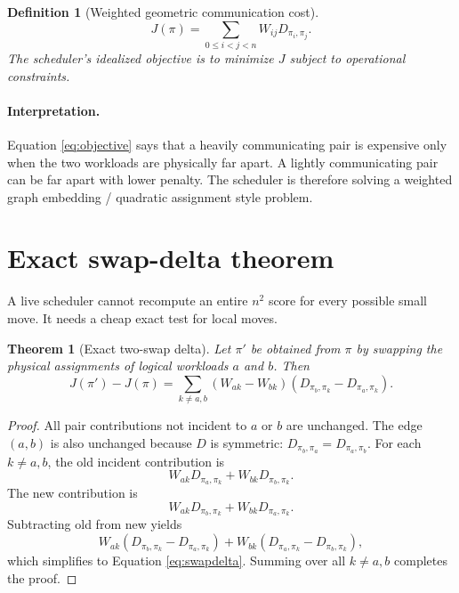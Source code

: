 \documentclass[11pt]{article}
\newtheorem{definition}{Definition}[section]
\newtheorem{theorem}{Theorem}[section]
\theoremstyle{remark}
\begin{document}
\begin{definition}[Weighted geometric communication cost]
\begin{equation}
J(\pi)=\sum_{0\le i<j<n} W_{ij}D_{\pi_i,\pi_j}.
\label{eq:objective}
\end{equation}
The scheduler's idealized objective is to minimize $J$ subject to operational constraints.
\end{definition}

\paragraph{Interpretation.} Equation \eqref{eq:objective} says that a heavily communicating pair is expensive only when the two workloads are physically far apart. A lightly communicating pair can be far apart with lower penalty. The scheduler is therefore solving a weighted graph embedding / quadratic assignment style problem.

\section{Exact swap-delta theorem}

A live scheduler cannot recompute an entire $n^2$ score for every possible small move. It needs a cheap exact test for local moves.

\begin{theorem}[Exact two-swap delta]
Let $\pi'$ be obtained from $\pi$ by swapping the physical assignments of logical workloads $a$ and $b$. Then
\begin{equation}
J(\pi')-J(\pi)=\sum_{k\ne a,b}(W_{ak}-W_{bk})\left(D_{\pi_b,\pi_k}-D_{\pi_a,\pi_k}\right).
\label{eq:swapdelta}
\end{equation}
\end{theorem}

\begin{proof}
All pair contributions not incident to $a$ or $b$ are unchanged. The edge $(a,b)$ is also unchanged because $D$ is symmetric:
$D_{\pi_b,\pi_a}=D_{\pi_a,\pi_b}$. For each $k\ne a,b$, the old incident contribution is
\[
W_{ak}D_{\pi_a,\pi_k}+W_{bk}D_{\pi_b,\pi_k}.
\]
The new contribution is
\[
W_{ak}D_{\pi_b,\pi_k}+W_{bk}D_{\pi_a,\pi_k}.
\]
Subtracting old from new yields
\[
W_{ak}(D_{\pi_b,\pi_k}-D_{\pi_a,\pi_k})+W_{bk}(D_{\pi_a,\pi_k}-D_{\pi_b,\pi_k}),
\]
which simplifies to Equation \eqref{eq:swapdelta}. Summing over all $k\ne a,b$ completes the proof.
\end{proof}
\end{document}
